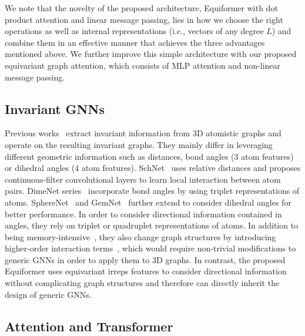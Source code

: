 {\begin{enumerate}
\end{enumerate}
We note that the novelty of the proposed architecture, Equiformer with dot product attention and linear message passing, lies in how we choose the right operations as well as internal representations (i.e., vectors of any degree $L$) and combine them in an effective manner that achieves the three advantages mentioned above.
We further improve this simple architecture with our proposed equivariant graph attention, which consists of MLP attention and non-linear message passing.
}

\subsection{Invariant GNNs}
\label{appendix:subsec:invariant_gnn}
Previous works~\citep{schnet, cgcnn, physnet, dimenet, dimenet_pp, orbnet, spherenet, spinconv, gemnet} extract invariant information from 3D atomistic graphs and operate on the resulting invariant graphs.
They mainly differ in leveraging different geometric information such as distances, bond angles (3 atom features) or dihedral angles (4 atom features).
SchNet~\citep{schnet} uses relative distances and proposes continuous-filter convolutional layers to learn local interaction between atom pairs. 
DimeNet series~\citep{dimenet, dimenet_pp} incorporate bond angles by using triplet representations of atoms.
SphereNet~\citep{spherenet} and GemNet~\citep{gemnet, gemnet_oc} further extend to consider dihedral angles for better performance.
In order to consider directional information contained in angles, they rely on triplet or quadruplet representations of atoms.
In addition to being memory-intensive~\citep{gemnet_xl}, they also change graph structures by introducing higher-order interaction terms~\citep{line_graph}, which would require non-trivial modifications to generic GNNs in order to apply them to 3D graphs.
In contrast, the proposed Equiformer uses equivariant irreps features to consider directional information without complicating graph structures and therefore can directly inherit the design of generic GNNs.


\subsection{Attention and Transformer}
\label{appendix:subsec:attention_and_transformers}

